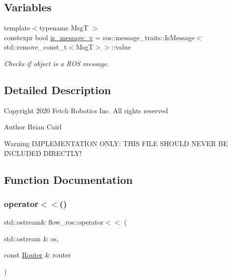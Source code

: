 \subsection*{Variables}
\begin{DoxyCompactItemize}
\item 
\mbox{\label{namespaceflow__ros_a9628f8bb8243036a41bcf1639e7ba57a}} 
{\footnotesize template$<$typename MsgT $>$ }\\constexpr bool \hyperlink{namespaceflow__ros_a9628f8bb8243036a41bcf1639e7ba57a}{is\+\_\+message\+\_\+v} = ros\+::message\+\_\+traits\+::\+Is\+Message$<$std\+::remove\+\_\+const\+\_\+t$<$MsgT$>$$>$\+::value
\begin{DoxyCompactList}\small\item\em Checks if object is a R\+OS message. \end{DoxyCompactList}\end{DoxyCompactItemize}


\subsection{Detailed Description}
\begin{DoxyCopyright}{Copyright}
2020 Fetch Robotics Inc. All rights reserved 
\end{DoxyCopyright}
\begin{DoxyAuthor}{Author}
Brian Cairl
\end{DoxyAuthor}
\begin{DoxyWarning}{Warning}
I\+M\+P\+L\+E\+M\+E\+N\+T\+A\+T\+I\+ON O\+N\+LY\+: T\+H\+IS F\+I\+LE S\+H\+O\+U\+LD N\+E\+V\+ER BE I\+N\+C\+L\+U\+D\+ED D\+I\+R\+E\+C\+T\+L\+Y! 
\end{DoxyWarning}


\subsection{Function Documentation}
\mbox{\label{namespaceflow__ros_a5adebd2e59fa0a6e7b11c442a46a445b}} 
\subsubsection{\texorpdfstring{operator$<$$<$()}{operator<<()}}
{\footnotesize\ttfamily std\+::ostream\& flow\+\_\+ros\+::operator$<$$<$ (\begin{DoxyParamCaption}\item[{std\+::ostream \&}]{os,  }\item[{const \hyperlink{classflow__ros_1_1_router}{Router} \&}]{router }\end{DoxyParamCaption})}


